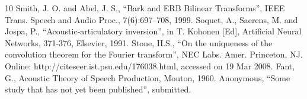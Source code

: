 \documentclass[a4paper]{article}
\begin{document}
%
\eightpt

\begin{thebibliography}{10}
 Smith, J. O. and Abel, J. S.,
``Bark and {ERB} Bilinear Transforms'',
IEEE Trans. Speech and Audio Proc., 7(6):697--708, 1999.
 Soquet, A., Saerens, M. and Jospa, P., ``Acoustic-articulatory
inversion'', in T. Kohonen [Ed], Artificial Neural Networks, 371-376,
Elsevier, 1991.
 Stone, H.S., ``On the uniqueness of the convolution theorem
for the Fourier transform'', NEC Labs. Amer. Princeton, NJ.
Online: http://citeseer.ist.psu.edu/176038.html, accessed on 19 Mar 2008.
 Fant, G., Acoustic Theory of Speech Production, Mouton, 1960.
 Anonymous, ``Some study that has not yet been published'', submitted.
\end{thebibliography}
\end{document}
